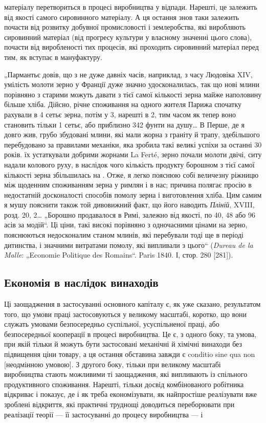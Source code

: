 \parcont{}  %
матеріалу перетвориться в процесі виробництва у відпади. Нарешті, це залежить від якості самого
сировинного матеріалу. А ця остання знов таки залежить почасти від розвитку добувної промисловості і
землеробства, які виробляють сировинний матеріал (від прогресу культури у власному значенні цього
слова), почасти від виробленості тих процесів, які проходить
сировинний матеріал перед тим, як вступає в мануфактуру.

„Пармантьє довів, що з не дуже давніх часів, наприклад, з часу Людовіка XIV, умілість молоти зерно у
Франції дуже
значно удосконалилась, так що нові млини порівняно з старими
можуть давати з тієї самої кількості зерна майже наполовину
більше хліба. Дійсно, річне споживання на одного жителя Парижа
спочатку рахували в 4 сетьє зерна, потім у 3, нарешті в 2, тим часом як тепер воно становить тільки
1 сетьє, або приблизно
342 фунти на душу\dots{} В Перше, де я довго жив, грубо збудовані млини, які мали жорна з граніту й
трапу, здебільшого перебудовано за правилами механіки, яка зробила такі великі успіхи за останні 30
років. їх устаткували добрими жорнами La Ferté,
зерно почали молоти двічі, ситу надали колового руху, в наслідок чого кількість продукту борошном з
тієї самої кількості
зерна збільшилась на . Отже, я легко пояснюю собі величезну
ріжницю між щоденним споживанням зерна у римлян і в нас;
причина полягає просію в недостатній досконалості способів
помолу зерна і виготовлення хліба. Цим самим я мушу пояснити
також той дивовижний факт, що його наводить \emph{Пліній}, XVIII,
розд. 20, 2\dots{} „Борошно продавалося в Римі, залежно від якості,
по 40, 48 або 96 асів за модій“. Ці ціни, такі високі порівняно
з одночасними цінами на зерно, пояснюються недосконалим станом млинів, які перебували тоді ще в
періоді дитинства, і значними витратами помолу, які випливали з цього“ (\emph{Dureau de la Malle}:
„Economie Politique des Romains“. Paris 1840. І, стор.
280 [281]).

\subsection{Економія в наслідок винаходів}

Ці заощадження в застосуванні основного капіталу є, як уже
сказано, результатом того, що умови праці застосовуються
у великому масштабі, коротко, що вони служать умовами безпосередньо суспільної, усуспільненої праці,
або безпосередньої
кооперації в процесі виробництва. Це є, з одного боку, та умова,
при якій тільки й можуть бути застосовані механічні й хімічні
винаходи без підвищення ціни товару, а ця остання обставина
завжди є conditio sine qua non [неодмінною умовою]. З другого
боку, тільки при великому масштабі виробництва стають можливими ті заощадження, які випливають із
спільного продуктивного
споживання. Нарешті, тільки досвід комбінованого робітника відкриває і показує, де і як треба
економізувати, як найпростіше
реалізувати вже зроблені відкриття, які практичні труднощі доводиться
переборювати при реалізації теорії — її застосуванні до
процесу виробництва — і~

